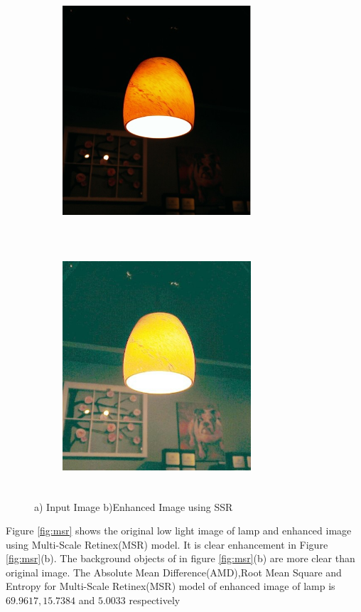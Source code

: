 \begin{figure}
	\begin{subfigure}{8cm}
		\centering    
    	\includegraphics[width=7cm,height=9cm,keepaspectratio]{images/ch5/bulb_input.jpg}
    	\caption{} 
    \end{subfigure}
  	\begin{subfigure}{6cm}
  		\centering
  		\includegraphics[width=7cm,height=9cm,keepaspectratio]{images/ch5/bulb_ssr.jpg}
   		\caption{}
  	\end{subfigure}
  	\caption{a) Input Image b)Enhanced Image using SSR}
  	\label{fig:ssr}
\end{figure}

Figure \ref{fig:msr} shows the original low light image of lamp and enhanced image using Multi-Scale Retinex(MSR) model. It is clear enhancement in Figure \ref{fig:msr}(b). The background objects of in figure \ref{fig:msr}(b) are more clear than original image. The Absolute Mean Difference(AMD),Root Mean Square and Entropy for Multi-Scale Retinex(MSR) model of enhanced image of lamp is $69.9617, 15.7384$ and $5.0033$ respectively      



